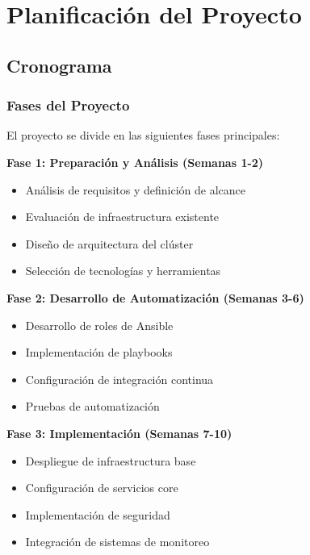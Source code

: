 \chapter{Planificación del Proyecto}
\section{Cronograma}
\subsection{Fases del Proyecto}
El proyecto se divide en las siguientes fases principales:

\begin{infocaja}
\textbf{Fase 1: Preparación y Análisis (Semanas 1-2)}
\begin{itemize}
    \item Análisis de requisitos y definición de alcance
    \item Evaluación de infraestructura existente
    \item Diseño de arquitectura del clúster
    \item Selección de tecnologías y herramientas
\end{itemize}
\end{infocaja}

\begin{infocaja}
\textbf{Fase 2: Desarrollo de Automatización (Semanas 3-6)}
\begin{itemize}
    \item Desarrollo de roles de Ansible
    \item Implementación de playbooks
    \item Configuración de integración continua
    \item Pruebas de automatización
\end{itemize}
\end{infocaja}

\begin{infocaja}
\textbf{Fase 3: Implementación (Semanas 7-10)}
\begin{itemize}
    \item Despliegue de infraestructura base
    \item Configuración de servicios core
    \item Implementación de seguridad
    \item Integración de sistemas de monitoreo
\end{itemize}
\end{infocaja}

